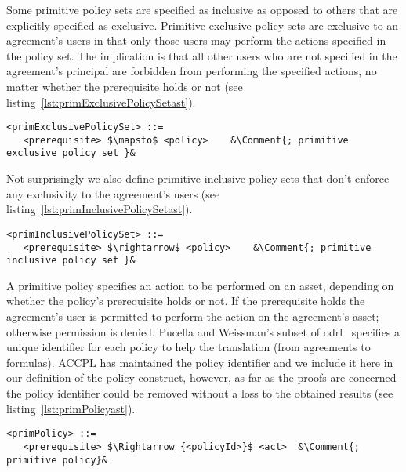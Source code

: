 Some primitive policy sets are specified as inclusive as opposed to others that are explicitly specified as exclusive. Primitive exclusive policy sets are exclusive to an agreement's users in that only those users may perform the actions specified in the policy set. The implication is that all other users who are not specified in the agreement's principal are forbidden from performing the specified actions, no matter whether the prerequisite holds or not (see listing~\ref{lst:primExclusivePolicySetast}).

\lstset{mathescape, language=AST, escapechar=\&}  
\begin{lstlisting}[frame=single, caption={primExclusivePolicySet},label={lst:primExclusivePolicySetast}]
<primExclusivePolicySet> ::=  
   <prerequisite> $\mapsto$ <policy>	&\Comment{; primitive exclusive policy set }&
\end{lstlisting}

Not surprisingly we also define primitive inclusive policy sets that don't enforce any exclusivity to the agreement's users (see listing~\ref{lst:primInclusivePolicySetast}).

\lstset{mathescape, language=AST, escapechar=\&}  
\begin{lstlisting}[frame=single, caption={primInclusivePolicySet},label={lst:primInclusivePolicySetast}]
<primInclusivePolicySet> ::=  
   <prerequisite> $\rightarrow$ <policy>	&\Comment{; primitive inclusive policy set }&
\end{lstlisting}


A primitive policy specifies an action to be performed on an asset, depending on whether the policy's prerequisite holds or not. If the prerequisite holds the agreement's user is permitted to perform the action on the agreement's asset; otherwise permission is denied. Pucella and Weissman's subset of \ac{odrl}~\cite{pucella2006} specifies a unique identifier for each policy to help the translation (from agreements to formulas). \ac{ACCPL} has maintained the policy identifier and we include it here in our definition of the policy construct, however, as far as the proofs are concerned the policy identifier could be removed without a loss to the obtained results (see listing~\ref{lst:primPolicyast}).


\lstset{mathescape, language=AST, escapechar=\&}  
\begin{minipage}[c]{0.95\textwidth}
\begin{lstlisting}[frame=single, caption={primPolicy},label={lst:primPolicyast}]
<primPolicy> ::=  
   <prerequisite> $\Rightarrow_{<policyId>}$ <act> 	&\Comment{; primitive policy}&
\end{lstlisting}
\end{minipage}

